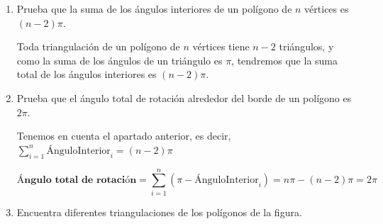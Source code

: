 \begin{enumerate}
	\item Prueba que la suma de los ángulos interiores de un polígono de $n$ vértices es $(n-2)\pi$.
	
	Toda triangulación de un polígono de $n$ vértices tiene $n-2$ triángulos, y como la suma de los ángulos de un triángulo es $\pi$, tendremos que la suma total de los ángulos interiores es $(n-2)\pi$.
	
	\item Prueba que el ángulo total de rotación alrededor del borde de un polígono es $2\pi$.
	
	Tenemos en cuenta el apartado anterior, es decir, $\sum_{i=1}^{n} \text{ÁnguloInterior}_i = (n-2) \pi $ 
	
	\[
	\textbf{Ángulo total de rotación} = \sum_{i=1}^{n} (\pi - \text{ÁnguloInterior}_i) = n \pi - (n-2)\pi = 2\pi 
	\]
	
	\item Encuentra diferentes triangulaciones de los polígonos de la figura.
	
	\begin{figure}[H]
		\centering
	\end{figure}
	

\end{enumerate}
